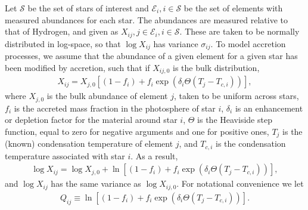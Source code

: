 \documentclass[preprint]{revtex4-1}
\begin{document}
	
Let $\mathcal{S}$ be the set of stars of interest and $\mathcal{E}_i, i\in \mathcal{S}$ be the set of elements with measured abundances for each star.
The abundances are measured relative to that of Hydrogen, and given as $X_{ij},j\in\mathcal{E}_i,i\in\mathcal{S}$.
These are taken to be normally distributed in log-space, so that $\log X_{ij}$ has variance $\sigma_{ij}$.
To model accretion processes, we assume that the abundance of a given element for a given star has been modified by accretion, such that if $X_{ij,0}$ is the bulk distribution,
\begin{align}
	X_{ij} = X_{j,0}\left[(1-f_i) + f_i \exp\left(\delta_i\Theta(T_j - T_{c,i})\right)\right],
\end{align}
where $X_{j,0}$ is the bulk abundance of element $j$, taken to be uniform across stars,  $f_i$ is the accreted mass fraction in the photosphere of star $i$, $\delta_i$ is an enhancement or depletion factor for the material around star $i$, $\Theta$ is the Heaviside step function, equal to zero for negative arguments and one for positive ones, $T_j$ is the (known) condensation temperature of element $j$, and $T_{c,i}$ is the condensation temperature associated with star $i$.
As a result,
\begin{align}
	\log X_{ij} = \log X_{j,0} + \ln \left[(1-f_i) + f_i \exp\left(\delta_i\Theta(T_j - T_{c,i})\right)\right],
\end{align}
and $\log X_{ij}$ has the same variance as $\log X_{ij,0}$.
For notational convenience we let
\begin{align}
	Q_{ij} \equiv \ln \left[(1-f_i) + f_i \exp\left(\delta_i\Theta(T_j - T_{c,i})\right)\right].
\end{align}
\end{document}
